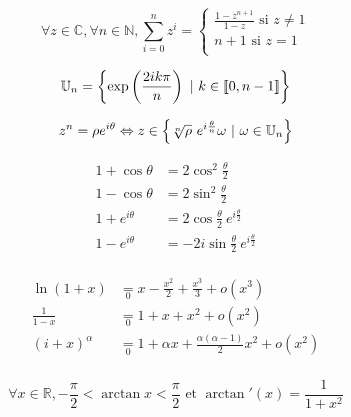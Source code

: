 
\begin{lemme}\[
    \forall z \in \mathbb{C}, \forall n \in \mathbb{N}, \sum_{i=0}^{n} z^i = \left\{\begin{array}{l} \frac{1-z^{n+1}}{1-z} \text{ si } z \neq 1 \\
                                                                                                    n+1 \text{ si } z = 1 \\
                                                                                    \end{array}\right.
\]\end{lemme}

\begin{lemme}\[
    \mathbb{U}_n = \left\{\exp\left(\frac{2ik\pi}{n}\right)\ |\ k\in\seg{0}{n-1}\right\}
\]\end{lemme}

\begin{lemme}\[
    z^n = \rho e^{i\theta} \equival z \in \left\{ \sqrt[n]{\rho}\ e^{i\frac{\theta}{n}}\omega\ |\ \omega\in\mathbb{U}_n\right\}
\]\end{lemme}

\begin{lemme}\[
    \begin{split}
        1+\cos\theta  &= 2\cos^2\frac{\theta}{2} \\
        1-\cos\theta  &= 2\sin^2\frac{\theta}{2} \\
        1+e^{i\theta} &= 2\cos\frac{\theta}{2}\ e^{i\frac{\theta}{2}} \\
        1-e^{i\theta} &= -2i\sin\frac{\theta}{2}\ e^{i\frac{\theta}{2}} \\
    \end{split}
\]\end{lemme}

\begin{lemme}\[
    \begin{split}
        \ln(1+x) &\underset{0}{=} x - \frac{x^2}{2} + \frac{x^3}{3} + o(x^3) \\
        \frac{1}{1-x} &\underset{0}{=} 1 + x + x^2 + o(x^2) \\
        (i+x)^\alpha &\underset{0}{=} 1 + \alpha x + \frac{\alpha(\alpha - 1)}{2}x^2 + o(x^2) \\
    \end{split}
\]\end{lemme}

\begin{lemme}\[
    \forall x \in \mathbb{R}, -\frac{\pi}{2} < \arctan x < \frac{\pi}{2} \text{ et } \arctan'(x) = \frac{1}{1+x^2}
\]\end{lemme}


